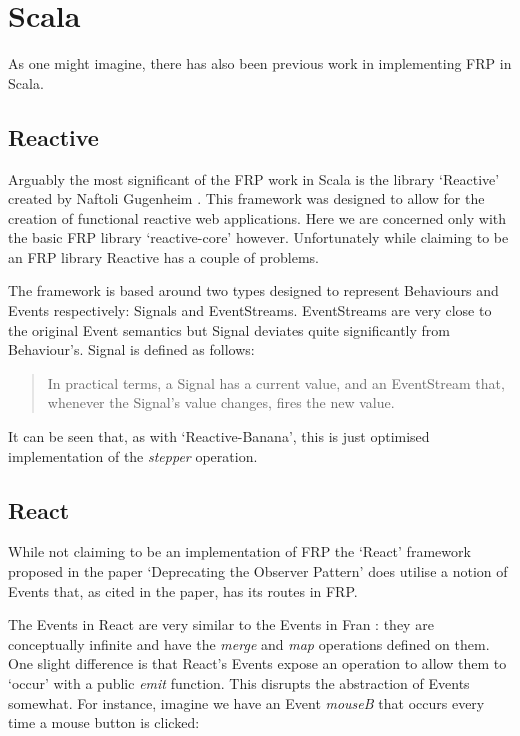   \section{Scala}
    As one might imagine, there has also been previous work in implementing FRP in Scala. 

    \subsection{Reactive}
      Arguably the most significant of the FRP work in Scala is the library `Reactive' created by Naftoli Gugenheim 
      \cite{Nafg}. This    
      framework was designed to allow for the creation of functional reactive web applications. Here we are concerned 
      only with the basic FRP library `reactive-core' however. Unfortunately while claiming to be an FRP library Reactive
      has a couple of problems.

      The framework is based around two types designed to represent Behaviours and Events respectively: Signals
      and EventStreams. EventStreams are very close to the original Event semantics but Signal deviates quite significantly 
      from Behaviour's. Signal is defined as follows:

      \begin{quote}
        In practical terms, a Signal has a current value, and an EventStream that, whenever the Signal's value changes,     
        fires the new value.
      \end{quote}  
      
      It can be seen that, as with `Reactive-Banana', this is just optimised implementation of the \emph{stepper}
      operation.

    \subsection{React}
      While not claiming to be an implementation of FRP the `React' framework proposed in the 
      paper `Deprecating the Observer Pattern' \cite{Maier2010} does utilise a notion of Events that, as cited in the paper,
      has its routes in FRP.

      The Events in React are very similar to the Events in Fran \cite{Elliott1997}: they are conceptually infinite
      and have the \emph{merge} and \emph{map} operations defined on them. One slight difference is that React's
      Events expose an operation to allow them to `occur' with a public \emph{emit} function. This disrupts
      the abstraction of Events somewhat. For instance, imagine we have an Event \emph{mouseB} that occurs
      every time a mouse button is clicked:

